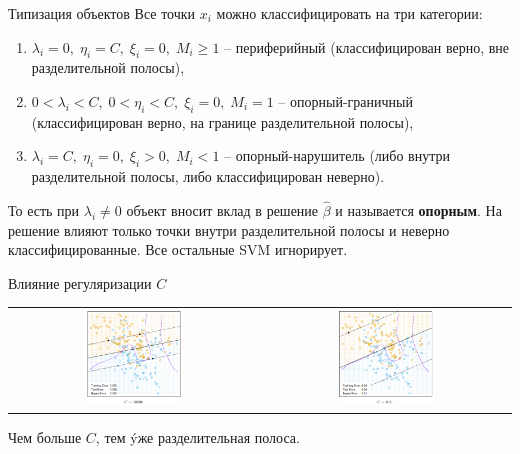 \documentclass[9pt]{beamer}
\begin{document}
\begin{frame}{Типизация объектов}
    Все точки $x_i$ можно классифицировать на три категории:
    \begin{enumerate}
        \item $\lambda_i=0,\; \eta_i=C,\; \xi_i=0,\; M_i \geq 1$ -- периферийный (классифицирован верно, вне разделительной полосы),
        \item $0< \lambda_i < C,\; 0< \eta_i < C,\; \xi_i = 0,\; M_i=1$ -- опорный-граничный (классифицирован верно, на границе разделительной полосы),
        \item $\lambda_i=C,\; \eta_i=0,\; \xi_i > 0,\; M_i<1$ -- опорный-нарушитель (либо внутри разделительной полосы, либо классифицирован неверно).
    \end{enumerate}
    То есть при $\lambda_i \neq 0$ объект вносит вклад в решение $\hat\beta$ и называется \textbf{опорным}. На решение влияют только точки внутри разделительной полосы и неверно классифицированные. Все остальные SVM игнорирует.
\end{frame}

\begin{frame}{Влияние регуляризации $C$}
    \begin{center}
        \begin{tabular}{cc}
             \includegraphics[width=0.4\textwidth]{img/svm_regularization_1.png}& 
             \includegraphics[width=0.4\textwidth]{img/svm_regularization_2.png}
        \end{tabular}
    \end{center}
    Чем больше $C$, тем \'{y}же разделительная полоса.
\end{frame}
\end{document}

